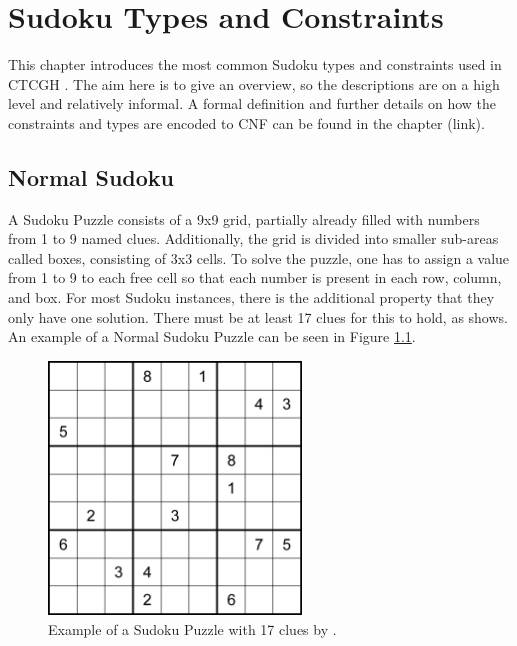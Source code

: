 \chapter{Sudoku Types and Constraints}
This chapter introduces the most common Sudoku types and constraints used in CTCGH \cite{CrackingTheCryptic2021}. The aim here is to give an overview, so the descriptions are on a high level and relatively informal. A formal definition and further details on how the constraints and types are encoded to CNF can be found in the chapter (link).

\section{Normal Sudoku}
A Sudoku Puzzle consists of a 9x9 grid, partially already filled with numbers from 1 to 9 named clues. Additionally, the grid is divided into smaller sub-areas called boxes, consisting of  3x3 cells. To solve the puzzle, one has to assign a value from 1 to 9 to each free cell so that each number is present in each row, column, and box.
For most Sudoku instances, there is the additional property that they only have one solution. There must be at least 17 clues for this to hold, as \citet{https://doi.org/10.48550/arxiv.1201.0749} shows. An example of a Normal Sudoku Puzzle can be seen in Figure \ref{fig:exampleSudoku}.

\begin{figure}
\centering
\includegraphics[width=0.6\textwidth]{Figures/17-clue sudoku puzzle (McGuire).png}
\caption{Example of a Sudoku Puzzle with 17 clues by \citet{https://doi.org/10.48550/arxiv.1201.0749}.}
\label{fig:exampleSudoku}
\end{figure}

